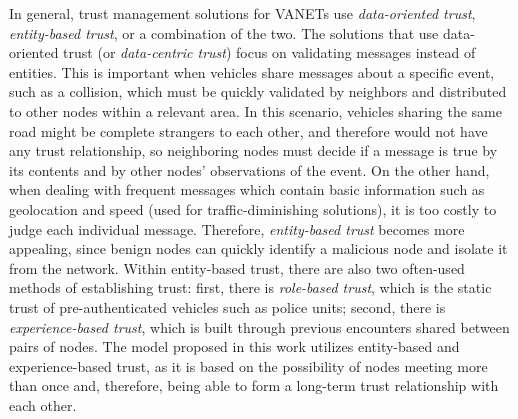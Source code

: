 In general, trust management solutions for VANETs use \textit{data-oriented trust}, \textit{entity-based trust}, or a combination of the two.
The solutions that use data-oriented trust (or \textit{data-centric trust}) \citep{raya2008data} focus on validating messages instead of entities.
This is important when vehicles share messages about a specific event, such as a collision, which must be quickly validated by neighbors and distributed to other nodes within a relevant area.
In this scenario, vehicles sharing the same road might be complete strangers to each other, and therefore would not have any trust relationship, so neighboring nodes must decide if a message is true by its contents and by other nodes' observations of the event.
On the other hand, when dealing with frequent messages which contain basic information such as geolocation and speed (used for traffic-diminishing solutions), it is too costly to judge each individual message.
Therefore, \textit{entity-based trust} becomes more appealing, since benign nodes can quickly identify a malicious node and isolate it from the network.
Within entity-based trust, there are also two often-used methods of establishing trust: first, there is \textit{role-based trust}, which is the static trust of pre-authenticated vehicles such as police units; second, there is \textit{experience-based trust}, which is built through previous encounters shared between pairs of nodes.
The model proposed in this work utilizes entity-based and experience-based trust, as it is based on the possibility of nodes meeting more than once and, therefore, being able to form a long-term trust relationship with each other.


